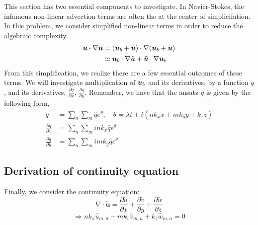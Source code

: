 \documentclass{article} \usepackage{amsfonts,amsmath, amssymb, xcolor, amsthm,}
\begin{document}
    This section has two essential components to investigate. In Navier-Stokes,
    the infamous non-linear advection terms are often the at the center of
    simplicifation. In this problem, we consider simplified non-linear terms in
    order to reduce the algebraic complexity. 
    \begin{align*}
        \boldsymbol{u} \cdot \nabla \boldsymbol{u} &= (\boldsymbol{u}_{b} + \tilde{\boldsymbol{u}}) \cdot \nabla 
        (\boldsymbol{u}_{b} + \tilde{\boldsymbol{u}})\\
        &\simeq \boldsymbol{u}_b \cdot \nabla \tilde{\boldsymbol{u}} + \tilde{\boldsymbol{u}} \cdot \nabla 
        \boldsymbol{u}_b
    \end{align*}
    From this simplification, we realize there are a few essential outcomes of
    these terms. We will investigate multiplication of $\boldsymbol{u}_b$ and its
    derivatives, by a function $q$, and its
    derivatives, $\frac{\partial q}{\partial x}$, $\frac{\partial q}{\partial y}$. 
    Remember, we have that the ansatz $q$ is given by the following form, 
    \begin{align}
        q &= \sum_n\sum_m \hat{q}e^{\theta}, \quad \theta = \lambda t + i(nk_xx +
        mk_yy + k_zz) \\
        \frac{\partial q}{\partial x} &= \sum_n\sum_m ink_x\hat{q}e^{\theta}  \\
        \frac{\partial q}{\partial y} &= \sum_n\sum_m imk_y\hat{q}e^{\theta}
    \end{align}


    \subsection{Derivation of continuity equation}

    Finally, we consider the continuity equation: \[\nabla \cdot \tilde{\bm{u}}
    = \frac{\partial \tilde{u}}{\partial x} +\frac{\partial \tilde{v}}{\partial
    y} +\frac{\partial \tilde{w}}{\partial z}\] \begin{equation}\Rightarrow
    nk_x\hat{u}_{m,n} +mk_v\hat{v}_{m,n}+k_z\hat{w}_{m,n} = 0 \end{equation}
    
\end{document}
